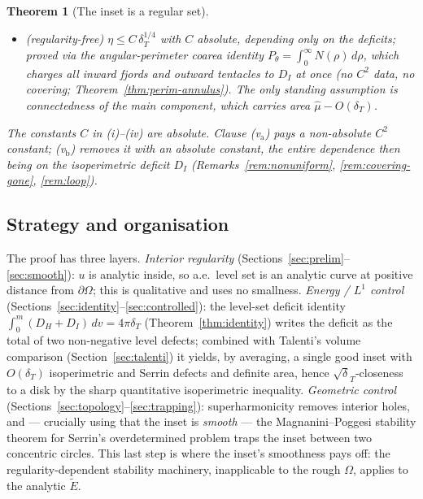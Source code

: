 \documentclass[11pt]{article}
\newtheorem{theorem}{Theorem}[section]
\theoremstyle{definition}
\newcommand{\Om}{\Omega}
\newcommand{\dT}{\delta_T}
\newcommand{\Etil}{\widetilde E}
\begin{document}
\begin{theorem}[The inset is a regular set]
\begin{enumerate}[label=\textup{(\roman*)},leftmargin=2.4em]
\begin{itemize}[leftmargin=1.4em]
$\eta\le C_{\mathrm{MP}}\,\dT^{\tau/2}$, $\tau\in(0,1]$ absolute, but
$C_{\mathrm{MP}}$ depending on the $C^2$ geometry of the smooth inset
\textup{(}Theorem~\ref{thm:annulus}\textup{)};
\item[\textup{(v$_{\mathrm{b}}$)}] \textup{(regularity-free)} $\eta\le
C\,\dT^{1/4}$ with $C$ \emph{absolute}, depending only on the deficits;
proved via the angular-perimeter coarea identity
$P_\theta=\int_0^\infty N(\rho)\,d\rho$, which charges all inward fjords and
outward tentacles to $D_I$ at once \textup{(}no $C^2$ data, no covering;
Theorem~\ref{thm:perim-annulus}\textup{)}. The only standing assumption is
connectedness of the main component, which carries area $\hat\mu-O(\dT)$.
\end{itemize}
\end{enumerate}
The constants $C$ in \textup{(i)--(iv)} are \emph{absolute}. Clause
\textup{(v$_{\mathrm a}$)} pays a non-absolute $C^2$ constant;
\textup{(v$_{\mathrm b}$)} removes it with an absolute constant, the entire
dependence then being on the isoperimetric deficit $D_I$
(Remarks~\ref{rem:nonuniform}, \ref{rem:covering-gone}, \ref{rem:loop}).
\end{theorem}

\subsection*{Strategy and organisation}
The proof has three layers. \emph{Interior regularity}
(Sections~\ref{sec:prelim}--\ref{sec:smooth}): $u$ is analytic inside, so
a.e.\ level set is an analytic curve at positive distance from
$\partial\Om$; this is qualitative and uses no smallness. \emph{Energy /
$L^1$ control} (Sections~\ref{sec:identity}--\ref{sec:controlled}): the
level-set deficit identity
$\int_0^m(D_H+D_I)\,dv=4\pi\dT$ (Theorem~\ref{thm:identity}) writes the
deficit as the total of two non-negative level defects; combined with
Talenti's volume comparison (Section~\ref{sec:talenti}) it yields, by
averaging, a single good inset with $O(\dT)$ isoperimetric and Serrin
defects and definite area, hence $\sqrt\dT$-closeness to a disk by the
sharp quantitative isoperimetric inequality. \emph{Geometric control}
(Sections~\ref{sec:topology}--\ref{sec:trapping}): superharmonicity removes
interior holes, and --- crucially using that the inset is \emph{smooth} ---
the Magnanini--Poggesi stability theorem for Serrin's overdetermined problem
traps the inset between two concentric circles. This last step is where the
inset's smoothness pays off: the regularity-dependent stability machinery,
inapplicable to the rough $\Om$, applies to the analytic $\Etil$.
\end{document}
